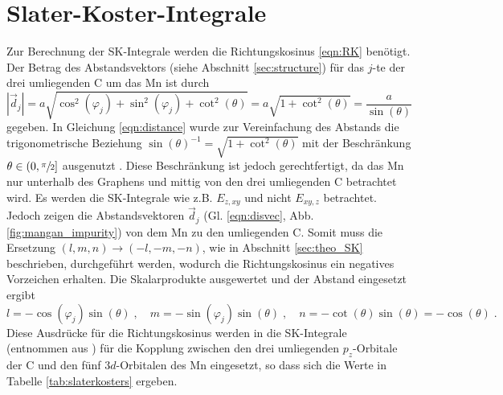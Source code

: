 \section{Slater-Koster-Integrale}
\label{sec:slaterkostercalc}
Zur Berechnung der SK-Integrale werden die Richtungskosinus \eqref{eqn:RK} benötigt.
Der Betrag des Abstandsvektors (siehe Abschnitt \ref{sec:structure}) für das $j$-te der drei umliegenden C um das Mn ist durch 
\begin{equation}
    \left | \vec{d}_j  \right | = a \sqrt{\cos^2(\varphi_j) + \sin^2(\varphi_j) + \cot^2(\theta)} = a \sqrt{1+\cot^2(\theta)} = \frac{a}{\sin(\theta)} \label{eqn:distance}
\end{equation}
gegeben.
In Gleichung \eqref{eqn:distance} wurde zur Vereinfachung des Abstands die trigonometrische Beziehung $ \sin(\theta)^{-1} = \sqrt{1+\cot^2(\theta)}$ mit der Beschränkung
$\theta \in ( 0, \sfrac{\pi}{2} ] $ ausgenutzt \cite{trig}. 
Diese Beschränkung ist jedoch gerechtfertigt, da das Mn nur unterhalb des Graphens und mittig von den drei umliegenden C betrachtet wird.
Es werden die SK-Integrale wie z.B. $E_{z,xy}$ und nicht $E_{xy,z}$ betrachtet.
Jedoch zeigen die Abstandsvektoren $\vec{d}_j$ (Gl. \eqref{eqn:disvec}, Abb. \ref{fig:mangan_impurity}) von dem Mn zu den umliegenden C.
Somit muss die Ersetzung $(l,m,n) \to (-l,-m,-n)$, wie in Abschnitt \ref{sec:theo_SK} beschrieben, durchgeführt werden, 
wodurch die Richtungskosinus ein negatives Vorzeichen erhalten.
Die Skalarprodukte ausgewertet und der Abstand eingesetzt ergibt
\begin{equation*}
    l = -\cos(\varphi_j) \sin(\theta) \; , \quad
    m = -\sin(\varphi_j) \sin(\theta) \; , \quad
    n = -\cot(\theta) \sin(\theta) = -\cos(\theta) \; .
\end{equation*}
Diese Ausdrücke für die Richtungskosinus werden in die SK-Integrale (entnommen aus \cite{PhysRev.94.1498}) für die Kopplung zwischen den drei umliegenden 
$p_z$-Orbitale der C und den fünf $3d$-Orbitalen des Mn eingesetzt,
so dass sich die Werte in Tabelle \ref{tab:slaterkosters} ergeben.
